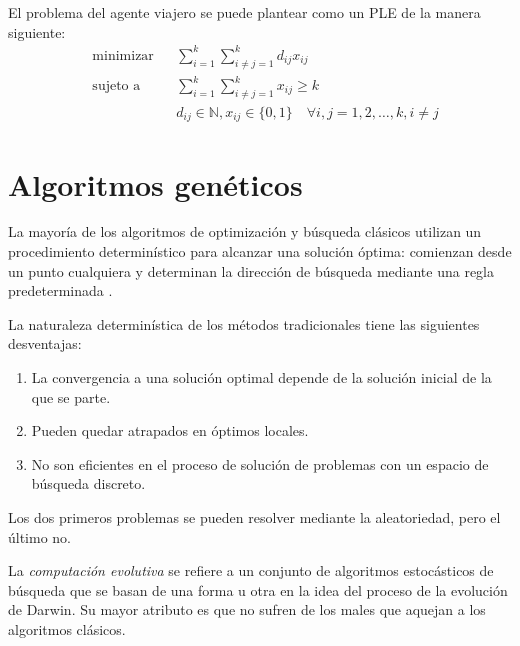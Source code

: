 \documentclass[12pt]{article}
\theoremstyle{bfTheoremWithNote}
\theoremstyle{bfRemark}
\newcommand{\Natural}{\mathbb{N}}
\begin{document}
        El problema del agente viajero se puede plantear como un PLE de la manera siguiente:
        \begin{equation}
            \begin{aligned}
                &\text{minimizar}   &&\sum_{i = 1}^k \sum_{i \neq j = 1}^k d_{ij} x_{ij}\\
                &\text{sujeto a}    &&\sum_{i = 1}^k \sum_{i \neq j = 1}^k x_{ij} \geq k\\
                &                   &&d_{ij} \in \Natural, x_{ij} \in \{0, 1\} \quad \forall i,j = 1, 2, \dots, k, i \neq j
            \end{aligned}
        \end{equation}

\section{Algoritmos genéticos}

    La mayoría de los algoritmos de optimización y búsqueda clásicos utilizan un procedimiento determinístico para alcanzar una solución óptima: comienzan desde un punto cualquiera y determinan la dirección de búsqueda mediante una regla predeterminada \cite{IMD2004}. 
        
    La naturaleza determinística de los métodos tradicionales tiene las siguientes desventajas:
    \begin{enumerate}
        \item La convergencia a una solución optimal depende de la solución inicial de la que se parte.
        \item Pueden quedar atrapados en óptimos locales.
        \item No son eficientes en el proceso de solución de problemas con un espacio de búsqueda discreto.
    \end{enumerate}
    Los dos primeros problemas se pueden resolver mediante la aleatoriedad, pero el último no.

    La \textit{computación evolutiva} se refiere a un conjunto de algoritmos estocásticos de búsqueda que se basan de una forma u otra en la idea del proceso de la evolución de Darwin. Su mayor atributo es que no sufren de los males que aquejan a los algoritmos clásicos.
    
\end{document}
